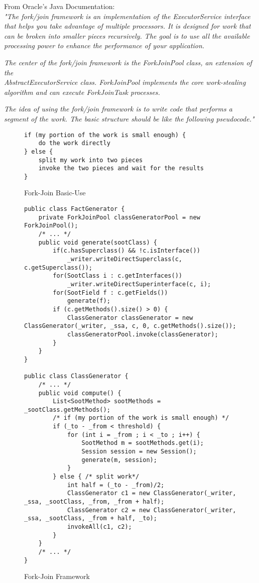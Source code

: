 \documentclass{dithesis}
\begin{document}
        From Oracle's Java Documentation: \\
    	\textit{"The fork/join framework is an implementation of the ExecutorService interface that helps you take advantage of multiple processors. It is designed for work that can be broken into smaller pieces recursively. The goal is to use all the available processing power to enhance the performance of your application.}
    	 
		\textit{The center of the fork/join framework is the ForkJoinPool class, an extension of the \\ AbstractExecutorService class. ForkJoinPool implements the core work-stealing algorithm and can execute ForkJoinTask processes.}
    	 
    	\textit{The idea of using the fork/join framework is to write code that performs a segment of the work. The basic structure should be like the following pseudocode."} \cite{Oracle Java Fork/Join Framework}

        \begin{figure}[H]
\begin{lstlisting}
if (my portion of the work is small enough) {
    do the work directly
} else {
    split my work into two pieces
    invoke the two pieces and wait for the results
}
\end{lstlisting}
        \caption{Fork-Join Basic-Use}
        \end{figure}

        \begin{figure}[H]
\begin{lstlisting}
public class FactGenerator {
    private ForkJoinPool classGeneratorPool = new ForkJoinPool();
    /* ... */
    public void generate(sootClass) {
        if(c.hasSuperclass() && !c.isInterface())
            _writer.writeDirectSuperclass(c, c.getSuperclass());
        for(SootClass i : c.getInterfaces())
            _writer.writeDirectSuperinterface(c, i);
        for(SootField f : c.getFields())
            generate(f);
        if (c.getMethods().size() > 0) {
            ClassGenerator classGenerator = new ClassGenerator(_writer, _ssa, c, 0, c.getMethods().size());
            classGeneratorPool.invoke(classGenerator);
        }
    }
}

public class ClassGenerator {
    /* ... */
    public void compute() {
        List<SootMethod> sootMethods = _sootClass.getMethods();
        /* if (my portion of the work is small enough) */
        if (_to - _from < threshold) {
            for (int i = _from ; i < _to ; i++) {
                SootMethod m = sootMethods.get(i);
                Session session = new Session();
                generate(m, session);
            }
        } else { /* split work*/
            int half = (_to - _from)/2;
            ClassGenerator c1 = new ClassGenerator(_writer, _ssa, _sootClass, _from, _from + half);
            ClassGenerator c2 = new ClassGenerator(_writer, _ssa, _sootClass, _from + half, _to);
            invokeAll(c1, c2);
        }
    }
    /* ... */
}
\end{lstlisting}
        \caption{Fork-Join Framework}
        \end{figure}
\end{document}
